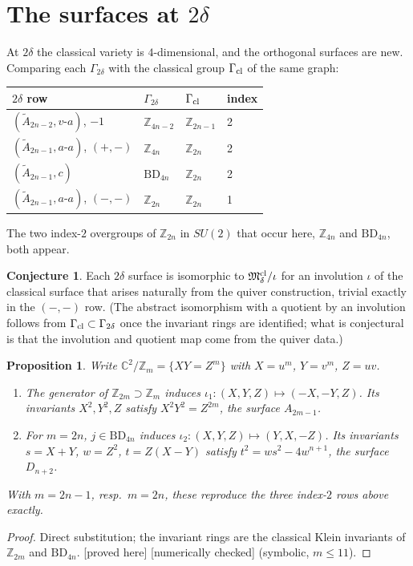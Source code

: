\documentclass[11pt]{article}
\newtheorem{proposition}[theorem]{Proposition}
\theoremstyle{definition}
\newtheorem{conjecture}[theorem]{Conjecture}
\theoremstyle{remark}
\newcommand{\tagP}{\textsf{\small[proved here]}}
\newcommand{\tagN}{\textsf{\small[numerically checked]}}
\newcommand{\C}{\mathbb{C}}\newcommand{\R}{\mathbb{R}}\newcommand{\Z}{\mathbb{Z}}
\newcommand{\M}{\mathfrak{M}}\newcommand{\Rep}{\mathrm{Rep}}\newcommand{\SRep}{\mathrm{SRep}}
\newcommand{\BD}{\mathrm{BD}}
\begin{document}
\section{The surfaces at $2\delta$}\label{sec:2delta}
At $2\delta$ the classical variety is $4$-dimensional, and the orthogonal surfaces are new. Comparing each $\Gamma_{2\delta}$ with the classical group $\Gamma_{\rm cl}$ of the same graph:
\begin{center}\small
\begin{tabular}{@{}llll@{}}\toprule
$2\delta$ row & $\Gamma_{2\delta}$ & $\Gamma_{\rm cl}$ & index\\\midrule
$(\widetilde A_{2n-2},v\text{-}a)$, $-1$ & $\Z_{4n-2}$ & $\Z_{2n-1}$ & 2\\
$(\widetilde A_{2n-1},a\text{-}a)$, $(+,-)$ & $\Z_{4n}$ & $\Z_{2n}$ & 2\\
$(\widetilde A_{2n-1},c)$ & $\BD_{4n}$ & $\Z_{2n}$ & 2\\
$(\widetilde A_{2n-1},a\text{-}a)$, $(-,-)$ & $\Z_{2n}$ & $\Z_{2n}$ & 1\\\bottomrule
\end{tabular}
\end{center}
The two index-$2$ overgroups of $\Z_{2n}$ in $SU(2)$ that occur here, $\Z_{4n}$ and $\BD_{4n}$, both appear.

\begin{conjecture}\label{conj:C}
Each $2\delta$ surface is isomorphic to $\M^{\rm cl}_\delta/\iota$ for an involution $\iota$ of the classical surface that arises naturally from the quiver construction, trivial exactly in the $(-,-)$ row. (The abstract isomorphism with a quotient by an involution follows from $\Gamma_{\rm cl}\subset\Gamma_{2\delta}$ once the invariant rings are identified; what is conjectural is that the involution and quotient map come from the quiver data.)
\end{conjecture}

\begin{proposition}\label{prop:rings}
Write $\C^2/\Z_m=\{XY=Z^m\}$ with $X=u^m$, $Y=v^m$, $Z=uv$.
\begin{enumerate}[label=(\alph*)]
\item The generator of $\Z_{2m}\supset\Z_m$ induces $\iota_1:(X,Y,Z)\mapsto(-X,-Y,Z)$. Its invariants $X^2,Y^2,Z$ satisfy $X^2Y^2=Z^{2m}$, the surface $A_{2m-1}$.
\item For $m=2n$, $j\in\BD_{4n}$ induces $\iota_2:(X,Y,Z)\mapsto(Y,X,-Z)$. Its invariants $s=X+Y$, $w=Z^2$, $t=Z(X-Y)$ satisfy $t^2=ws^2-4w^{n+1}$, the surface $D_{n+2}$.
\end{enumerate}
With $m=2n-1$, resp.\ $m=2n$, these reproduce the three index-$2$ rows above exactly.
\end{proposition}
\begin{proof}
Direct substitution; the invariant rings are the classical Klein invariants of $\Z_{2m}$ and $\BD_{4n}$. \tagP{} \tagN{} (symbolic, $m\le11$).
\end{proof}
\end{document}
